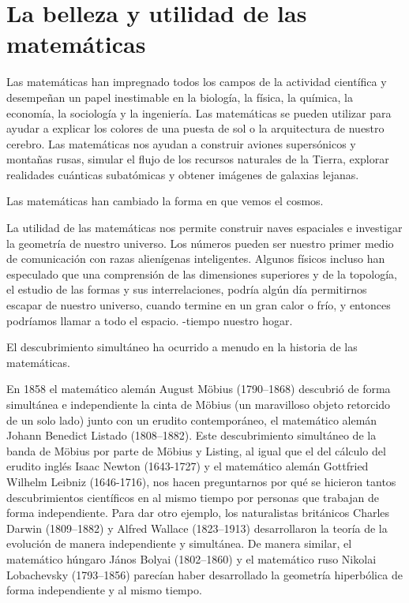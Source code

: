 \documentclass{article}
\begin{document}
\section{La belleza y utilidad de las matemáticas}

Las matemáticas han impregnado todos los campos de la actividad científica y
desempeñan un papel inestimable en la biología, la física, la química, la
economía, la sociología y la ingeniería. Las matemáticas se pueden utilizar para
ayudar a explicar los colores de una puesta de sol o la arquitectura de nuestro
cerebro. Las matemáticas nos ayudan a construir aviones supersónicos y montañas
rusas, simular el flujo de los recursos naturales de la Tierra, explorar
realidades cuánticas subatómicas y obtener imágenes de galaxias lejanas.

Las matemáticas han cambiado la forma en que vemos el cosmos.

La utilidad de las matemáticas nos permite construir naves espaciales e
investigar la geometría de nuestro universo. Los números pueden ser nuestro
primer medio de comunicación con razas alienígenas inteligentes. Algunos físicos
incluso han especulado que una comprensión de las dimensiones superiores y de la
topología, el estudio de las formas y sus interrelaciones, podría algún día
permitirnos escapar de nuestro universo, cuando termine en un gran calor o frío,
y entonces podríamos llamar a todo el espacio. -tiempo nuestro hogar.

El descubrimiento simultáneo ha ocurrido a menudo en la historia de las
matemáticas.

En 1858 el matemático alemán August Möbius (1790–1868) descubrió de forma simultánea e independiente
la cinta de Möbius (un maravilloso objeto retorcido de un solo lado) junto con
un erudito contemporáneo, el matemático alemán Johann Benedict Listado
(1808–1882). Este descubrimiento simultáneo de la banda de Möbius por parte de
Möbius y Listing, al igual que el del cálculo del erudito inglés Isaac Newton
(1643-1727) y el matemático alemán Gottfried Wilhelm Leibniz (1646-1716), nos
hacen preguntarnos por qué se hicieron tantos descubrimientos científicos en al
mismo tiempo por personas que trabajan de forma independiente. Para dar otro
ejemplo, los naturalistas británicos Charles Darwin (1809–1882) y Alfred Wallace
(1823–1913) desarrollaron la teoría de la evolución de manera independiente y
simultánea. De manera similar, el matemático húngaro János Bolyai (1802–1860) y
el matemático ruso Nikolai Lobachevsky (1793–1856) parecían haber desarrollado
la geometría hiperbólica de forma independiente y al mismo tiempo. \\
\end{document}

